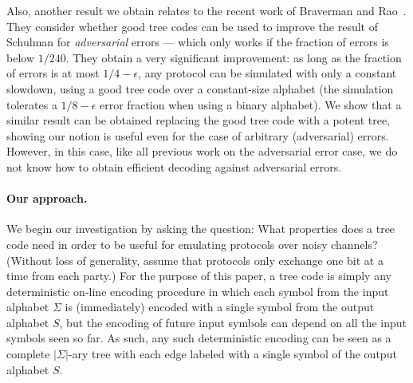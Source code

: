 \documentclass[ letterpaper, 11pt]{article}
\newcommand{\potent}{potent\xspace}
\begin{document}
Also, another result we obtain relates to the recent work of
Braverman and Rao~\cite{BR10}. They consider whether good tree codes
can be used to improve the result of Schulman for \emph{adversarial}
errors --- which only works if the fraction of errors is below
$1/240$. They obtain a very significant improvement: as long as the
fraction of errors is at most $1/4-\epsilon$, any protocol can be
simulated with only a constant slowdown, using a good tree code over
a constant-size alphabet (the simulation tolerates a $1/8-\epsilon$
error fraction when using a binary alphabet). We show that a similar
result can be obtained replacing the good tree code with a \potent
tree, showing our notion is useful even for the case of arbitrary
(adversarial) errors. However, in this case, like all previous work
on the adversarial error case, we do not know how to obtain
efficient decoding against adversarial errors.


\paragraph{Our approach.}
We begin our investigation by asking the question: What properties
does a tree code need in order to be useful for emulating protocols
over noisy channels?  (Without loss of generality, assume that
protocols only exchange one bit at a time from each party.) For the
purpose of this paper, a tree code is simply any deterministic
on-line encoding procedure in which each symbol from the input
alphabet $\Sigma$ is (immediately) encoded with a single symbol from
the output alphabet $S$, but the encoding of future input symbols
can depend on all the input symbols seen so far.  As such, any such
deterministic encoding can be seen as a complete $|\Sigma|$-ary tree
with each edge labeled with a single symbol of the output alphabet
$S$.
\end{document}
